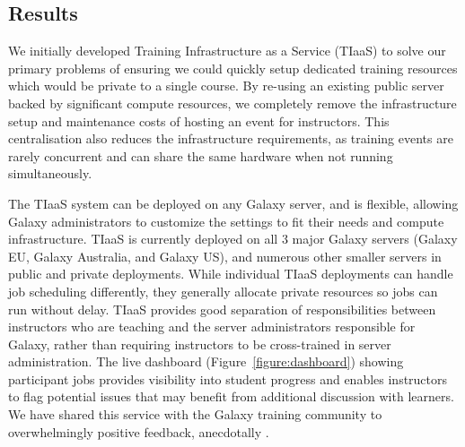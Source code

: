 \documentclass[a4paper,num-refs]{oup-contemporary}
\begin{document}
\subsection{Results}

We initially developed Training Infrastructure as a Service (TIaaS) to solve our primary problems of ensuring we could quickly setup dedicated training resources which would be private to a single course. By re-using an existing public server backed by significant compute resources, we completely remove the infrastructure setup and maintenance costs of hosting an event for instructors. This centralisation also reduces the infrastructure requirements, as training events are rarely concurrent and can share the same hardware when not running simultaneously. 

The TIaaS system can be deployed on any Galaxy server, and is flexible, allowing Galaxy administrators to customize the settings to fit their needs and compute infrastructure. TIaaS is currently deployed on all 3 major Galaxy servers (Galaxy EU, Galaxy Australia, and Galaxy US), and numerous other smaller servers in public and private deployments. While individual TIaaS deployments can handle job scheduling differently, they generally allocate private resources so jobs can run without delay. TIaaS provides good separation of responsibilities between instructors who are teaching and the server administrators responsible for Galaxy, rather than requiring instructors to be cross-trained in server administration. The live dashboard (Figure~\ref{figure:dashboard}) showing participant jobs provides visibility into student progress and enables instructors to flag potential issues that may benefit from additional discussion with learners. We have shared this service with the Galaxy training community to overwhelmingly positive feedback, anecdotally \cite{tiaas_feedback}.
\end{document}
